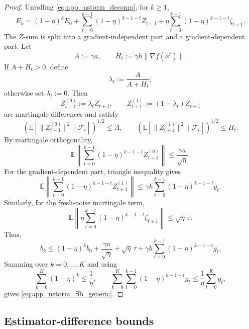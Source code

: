 \documentclass[letter,11pt]{article}
\newcommand{\E}{\mathbb{E}}
\newcommand{\cF}{\mathcal{F}}
\begin{document}
\begin{proof}
Unrolling \eqref{eq:app_nstorm_decomp}, for \(k\ge1\),
\[
    E_k
    =
    (1-\eta)^kE_0
    +
    \sum_{t=0}^{k-1}(1-\eta)^{k-1-t}Z_{t+1}
    +
    \eta\sum_{t=0}^{k-1}(1-\eta)^{k-1-t}\zeta_{t+1}.
\]
The \(Z\)-sum is split into a gradient-independent part and a
gradient-dependent part. Let
\[
    A:=\gamma a,
    \qquad
    H_t:=\gamma h\|\nabla f(x^t)\|.
\]
If \(A+H_t>0\), define
\[
    \lambda_t:=\frac{A}{A+H_t};
\]
otherwise set \(\lambda_t:=0\). Then
\[
    Z_{t+1}^{(0)}:=\lambda_tZ_{t+1},
    \qquad
    Z_{t+1}^{(1)}:=(1-\lambda_t)Z_{t+1}
\]
are martingale differences and satisfy
\[
    \left(\E[\|Z_{t+1}^{(0)}\|^2\mid\cF_t]\right)^{1/2}\le A,
    \qquad
    \left(\E[\|Z_{t+1}^{(1)}\|^2\mid\cF_t]\right)^{1/2}\le H_t.
\]
By martingale orthogonality,
\[
    \E\left\|
    \sum_{t=0}^{k-1}(1-\eta)^{k-1-t}Z_{t+1}^{(0)}
    \right\|
    \le
    \frac{\gamma a}{\sqrt\eta}.
\]
For the gradient-dependent part, triangle inequality gives
\[
    \E\left\|
    \sum_{t=0}^{k-1}(1-\eta)^{k-1-t}Z_{t+1}^{(1)}
    \right\|
    \le
    \gamma h
    \sum_{t=0}^{k-1}(1-\eta)^{k-1-t}g_t.
\]
Similarly, for the fresh-noise martingale term,
\[
    \E\left\|
    \eta\sum_{t=0}^{k-1}(1-\eta)^{k-1-t}\zeta_{t+1}
    \right\|
    \le
    \sqrt\eta\,\tau.
\]
Thus,
\[
    b_k
    \le
    (1-\eta)^kb_0
    +
    \frac{\gamma a}{\sqrt\eta}
    +
    \sqrt\eta\,\tau
    +
    \gamma h
    \sum_{t=0}^{k-1}(1-\eta)^{k-1-t}g_t.
\]
Summing over \(k=0,\ldots,K\) and using
\[
    \sum_{k=0}^K(1-\eta)^k\le\frac1\eta,
    \qquad
    \sum_{k=0}^K\sum_{t=0}^{k-1}(1-\eta)^{k-1-t}g_t
    \le
    \frac1\eta\sum_{t=0}^K g_t,
\]
gives \eqref{eq:app_nstorm_Sb_generic}.
\end{proof}

\subsection{Estimator-difference bounds}
\label{app:nstorm_estimator_bounds}
\end{document}
